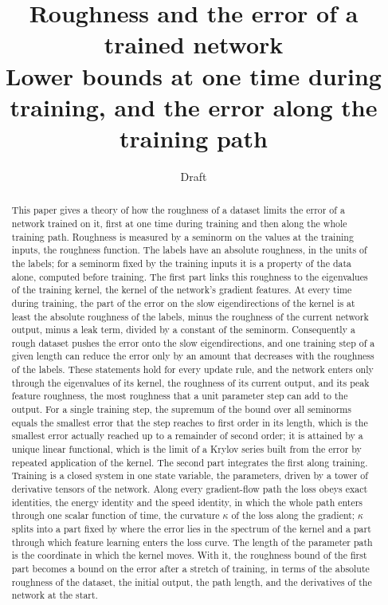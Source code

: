 \documentclass[11pt]{article}
\title{Roughness and the error of a trained network\\[4pt]
\large Lower bounds at one time during training, and the error along the training path}
\author{Draft}
\date{}
\theoremstyle{definition}
\theoremstyle{remark}
\begin{document}
\maketitle

\begin{abstract}
This paper gives a theory of how the roughness of a dataset limits the error of a network trained on it, first at one time during training and then along the whole training path.
Roughness is measured by a seminorm on the values at the training inputs, the roughness function.
The labels have an absolute roughness, in the units of the labels; for a seminorm fixed by the training inputs it is a property of the data alone, computed before training.
The first part links this roughness to the eigenvalues of the training kernel, the kernel of the network's gradient features.
At every time during training, the part of the error on the slow eigendirections of the kernel is at least the absolute roughness of the labels, minus the roughness of the current network output, minus a leak term, divided by a constant of the seminorm.
Consequently a rough dataset pushes the error onto the slow eigendirections, and one training step of a given length can reduce the error only by an amount that decreases with the roughness of the labels.
These statements hold for every update rule, and the network enters only through the eigenvalues of its kernel, the roughness of its current output, and its peak feature roughness, the most roughness that a unit parameter step can add to the output.
For a single training step, the supremum of the bound over all seminorms equals the smallest error that the step reaches to first order in its length, which is the smallest error actually reached up to a remainder of second order; it is attained by a unique linear functional, which is the limit of a Krylov series built from the error by repeated application of the kernel.
The second part integrates the first along training.
Training is a closed system in one state variable, the parameters, driven by a tower of derivative tensors of the network.
Along every gradient-flow path the loss obeys exact identities, the energy identity and the speed identity, in which the whole path enters through one scalar function of time, the curvature $\kappa$ of the loss along the gradient; $\kappa$ splits into a part fixed by where the error lies in the spectrum of the kernel and a part through which feature learning enters the loss curve.
The length of the parameter path is the coordinate in which the kernel moves.
With it, the roughness bound of the first part becomes a bound on the error after a stretch of training, in terms of the absolute roughness of the dataset, the initial output, the path length, and the derivatives of the network at the start.

\end{abstract}
\end{document}

